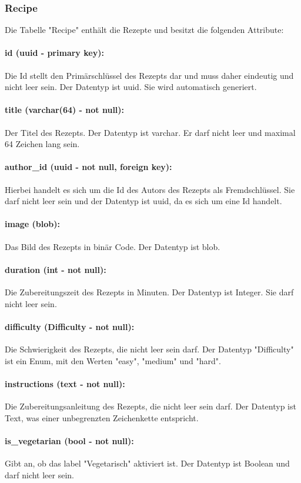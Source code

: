\documentclass[parskip=full]{scrartcl}
\begin{document}
\subsubsection{Recipe}
Die Tabelle "Recipe" enthält die Rezepte und besitzt die folgenden Attribute:
\paragraph{id (uuid - primary key):} Die Id stellt den Primärschlüssel des Rezepts dar und muss daher eindeutig und nicht leer sein. Der Datentyp ist \Gls{uuid}. Sie wird automatisch generiert.
\paragraph{title (varchar(64) - not null):} Der Titel des Rezepts. Der Datentyp ist \Gls{varchar}. Er darf nicht leer und maximal 64 Zeichen lang sein.
\paragraph{author\_id (uuid - not null, foreign key):} Hierbei handelt es sich um die Id des Autors des Rezepts als Fremdschlüssel. Sie darf nicht leer sein und der Datentyp ist \Gls{uuid}, da es sich um eine Id handelt.
\paragraph{image (blob):} Das Bild des Rezepts in binär Code. Der Datentyp ist \Gls{blob}.
\paragraph{duration (int - not null):} Die Zubereitungszeit des Rezepts in Minuten. Der Datentyp ist Integer. Sie darf nicht leer sein.
\paragraph{difficulty (Difficulty - not null):} Die Schwierigkeit des Rezepts, die nicht leer sein darf. Der Datentyp "Difficulty" ist ein Enum, mit den Werten "easy", "medium" und "hard".
\paragraph{instructions (text - not null):} Die Zubereitungsanleitung des Rezepts, die nicht leer sein darf. Der Datentyp ist Text, was einer unbegrenzten Zeichenkette entspricht.
\paragraph{is\_vegetarian (bool - not null):} Gibt an, ob das \Gls{label} "Vegetarisch" aktiviert ist. Der Datentyp ist Boolean und darf nicht leer sein.
\end{document}
